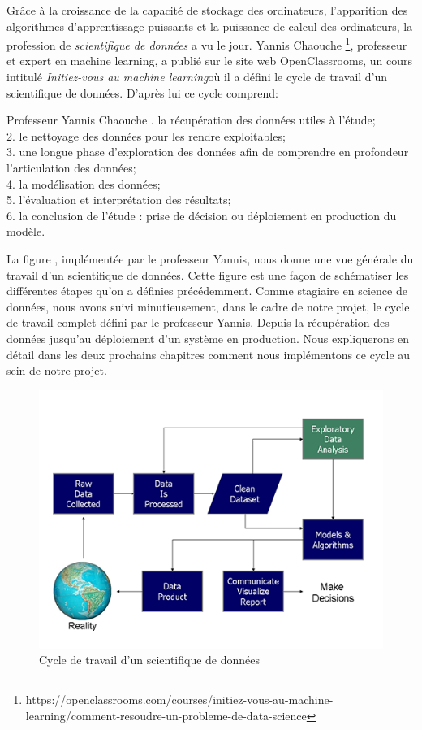 \documentclass[12pt, french]{report}
\begin{document}
Grâce à la croissance de la capacité de stockage des ordinateurs, l'apparition des algorithmes d'apprentissage puissants et la puissance de calcul des ordinateurs, la profession de \textit{scientifique de données} a vu le jour. Yannis Chaouche \footnote{https://openclassrooms.com/courses/initiez-vous-au-machine-learning/comment-resoudre-un-probleme-de-data-science}, professeur et expert en machine learning, a publié sur le site web OpenClassrooms, un cours intitulé  \guillemotleft \textit{Initiez-vous au machine learning}\guillemotright  où il a défini le cycle de travail d'un scientifique de données. D'après lui ce cycle comprend:

\begin{pquotation}{Professeur Yannis Chaouche}
		. la récupération des données utiles à l'étude;\\
		2. le nettoyage des données pour les rendre exploitables;\\
		3. une longue phase d'exploration des données afin de comprendre en profondeur l'articulation des données;\\
		4. la modélisation des données;\\
		5. l'évaluation et interprétation des résultats;\\
		6. la conclusion de l'étude : prise de décision ou déploiement en production du modèle.
\end{pquotation}  

La figure \cite{key6}, implémentée par le professeur Yannis,  nous donne une vue générale du travail d'un scientifique de données. Cette figure est une façon de schématiser les différentes étapes qu'on a définies précédemment. Comme stagiaire en science de données, nous avons suivi minutieusement, dans le cadre de notre projet, le cycle de travail complet défini par le professeur Yannis. Depuis la récupération des données jusqu'au déploiement d'un système en production. Nous expliquerons en détail dans les deux prochains chapitres comment nous implémentons ce cycle au sein de notre projet. 
\begin{figure}[h]
\includegraphics[]{images/workflow_datascientis.png}
\caption{Cycle de travail d'un scientifique de données}
\label{workflow_datascientis}
\end{figure}
\end{document}
